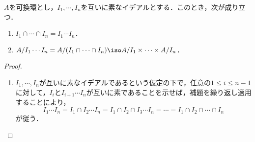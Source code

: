 \documentclass[uplatex,dvipdfmx]{jsreport}
\begin{document}
\begin{theorem}\label{thm-Chinese-remainder-theorem}
    $A$を可換環とし，$I_1,\cdots,I_n$を互いに素なイデアルとする．このとき，次が成り立つ．
    \begin{enumerate}
        \item $I_1\cap\cdots\cap I_n=I_1\cdots I_n$．
        \item $A/I_1\cdots I_n=A/(I_1\cap\cdots\cap I_n)\iso A/I_1\times\cdots\times A/I_n$．
    \end{enumerate}
\end{theorem}
\begin{proof}\mbox{}
    \begin{enumerate}
        \item $I_1,\cdots,I_n$が互いに素なイデアルであるという仮定の下で，任意の$1\le i\le n-1$に対して，$I_i$と$I_{i+1}\cdots I_n$が互いに素であることを示せば，補題を繰り返し適用することにより，
        \[I_1\cdots I_n=I_1\cap I_2\cdots I_n=I_1\cap I_2\cap I_3\cdots I_n=\cdots=I_1\cap I_2\cap\cdots\cap I_n\]
        が従う．


\end{enumerate}
\end{proof}
\end{document}
